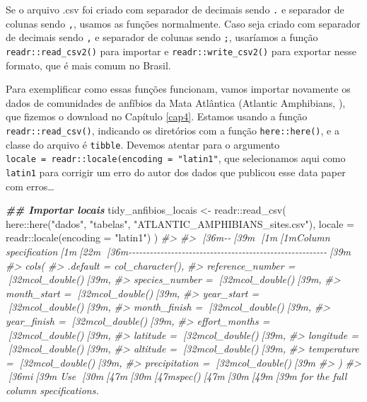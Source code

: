 \documentclass[
]{book}
\newenvironment{Shaded}{\begin{snugshade}}{\end{snugshade}}
\newcommand{\AttributeTok}[1]{\textcolor[rgb]{0.61,0.61,0.61}{#1}}
\newcommand{\CommentTok}[1]{\textcolor[rgb]{0.37,0.37,0.37}{\textit{#1}}}
\newcommand{\DocumentationTok}[1]{\textcolor[rgb]{0.37,0.37,0.37}{\textbf{\textit{#1}}}}
\newcommand{\FunctionTok}[1]{\textcolor[rgb]{0,0,0}{#1}}
\newcommand{\NormalTok}[1]{#1}
\newcommand{\OtherTok}[1]{\textcolor[rgb]{0.37,0.37,0.37}{#1}}
\newcommand{\SpecialCharTok}[1]{\textcolor[rgb]{0,0,0}{#1}}
\newcommand{\StringTok}[1]{\textcolor[rgb]{0.5,0.5,0.5}{#1}}
\begin{document}
Se o arquivo .csv foi criado com separador de decimais sendo \texttt{.} e separador de colunas sendo \texttt{,}, usamos as funções normalmente. Caso seja criado com separador de decimais sendo \texttt{,} e separador de colunas sendo \texttt{;}, usaríamos a função \texttt{readr::read\_csv2()} para importar e \texttt{readr::write\_csv2()} para exportar nesse formato, que é mais comum no Brasil.

Para exemplificar como essas funções funcionam, vamos importar novamente os dados de comunidades de anfíbios da Mata Atlântica (Atlantic Amphibians, \citet{vancine2018}), que fizemos o download no Capítulo \ref{cap4}. Estamos usando a função \texttt{readr::read\_csv()}, indicando os diretórios com a função \texttt{here::here()}, e a classe do arquivo é \texttt{tibble}. Devemos atentar para o argumento \texttt{locale\ =\ readr::locale(encoding\ =\ "latin1"}, que selecionamos aqui como \texttt{latin1} para corrigir um erro do autor dos dados que publicou esse data paper com erros\ldots{}

\begin{Shaded}
\begin{Highlighting}[]
\DocumentationTok{\#\# Importar locais}
\NormalTok{tidy\_anfibios\_locais }\OtherTok{\textless{}{-}}\NormalTok{ readr}\SpecialCharTok{::}\FunctionTok{read\_csv}\NormalTok{(}
\NormalTok{  here}\SpecialCharTok{::}\FunctionTok{here}\NormalTok{(}\StringTok{"dados"}\NormalTok{, }\StringTok{"tabelas"}\NormalTok{, }\StringTok{"ATLANTIC\_AMPHIBIANS\_sites.csv"}\NormalTok{),}
  \AttributeTok{locale =}\NormalTok{ readr}\SpecialCharTok{::}\FunctionTok{locale}\NormalTok{(}\AttributeTok{encoding =} \StringTok{"latin1"}\NormalTok{)}
\NormalTok{  )}
\CommentTok{\#\textgreater{} }
\CommentTok{\#\textgreater{} [36m{-}{-}[39m [1m[1mColumn specification[1m[22m [36m{-}{-}{-}{-}{-}{-}{-}{-}{-}{-}{-}{-}{-}{-}{-}{-}{-}{-}{-}{-}{-}{-}{-}{-}{-}{-}{-}{-}{-}{-}{-}{-}{-}{-}{-}{-}{-}{-}{-}{-}{-}{-}{-}{-}{-}{-}{-}{-}{-}{-}{-}{-}{-}{-}{-}{-}[39m}
\CommentTok{\#\textgreater{} cols(}
\CommentTok{\#\textgreater{}   .default = col\_character(),}
\CommentTok{\#\textgreater{}   reference\_number = [32mcol\_double()[39m,}
\CommentTok{\#\textgreater{}   species\_number = [32mcol\_double()[39m,}
\CommentTok{\#\textgreater{}   month\_start = [32mcol\_double()[39m,}
\CommentTok{\#\textgreater{}   year\_start = [32mcol\_double()[39m,}
\CommentTok{\#\textgreater{}   month\_finish = [32mcol\_double()[39m,}
\CommentTok{\#\textgreater{}   year\_finish = [32mcol\_double()[39m,}
\CommentTok{\#\textgreater{}   effort\_months = [32mcol\_double()[39m,}
\CommentTok{\#\textgreater{}   latitude = [32mcol\_double()[39m,}
\CommentTok{\#\textgreater{}   longitude = [32mcol\_double()[39m,}
\CommentTok{\#\textgreater{}   altitude = [32mcol\_double()[39m,}
\CommentTok{\#\textgreater{}   temperature = [32mcol\_double()[39m,}
\CommentTok{\#\textgreater{}   precipitation = [32mcol\_double()[39m}
\CommentTok{\#\textgreater{} )}
\CommentTok{\#\textgreater{} [36mi[39m Use [30m[47m[30m[47m\textasciigrave{}spec()\textasciigrave{}[47m[30m[49m[39m for the full column specifications.}
\end{Highlighting}
\end{Shaded}
\end{document}

